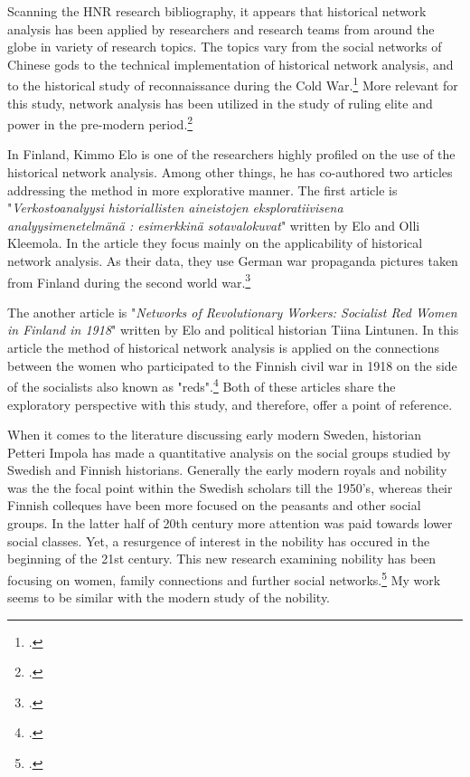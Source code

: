 \documentclass[a4paper,12pt]{article}
\begin{document}
\begin{onehalfspace}
Scanning the HNR research bibliography, it appears that historical network analysis has been applied by researchers and research teams from around the globe in variety of research topics. The topics vary from the social networks of Chinese gods to the technical implementation of historical network analysis, and to the historical study of reconnaissance during the Cold War.\footcites[p. 22.]{elo16}{hnrbib} More relevant for this study, network analysis has been utilized in the study of ruling elite and power in the pre-modern period.\footcite[See e. g. Ruth Ahnert's and Sebastian E. Ahnert's book \textit{Tudor Networks of Power} (2023) or Paul D Mclean's article \textit{Widening Access While Tightening Control: Office-Holding, Marriages, and Elite Consolidation in Early Modern Poland} (2004).]{JonVidarEt} 
 
In Finland, Kimmo Elo is one of the researchers highly profiled on the use of the historical network analysis. Among other things, he has co-authored two articles addressing the method in more explorative manner. The first article is "\textit{Verkostoanalyysi historiallisten aineistojen eksploratiivisena analyysimenetelmänä : esimerkkinä sotavalokuvat}" written by Elo and Olli Kleemola. In the article they focus mainly on the applicability of historical network analysis. As their data, they use German war propaganda pictures taken from Finland during the second world war.\footcite{eloAklee15}

The another article is "\textit{Networks of Revolutionary Workers: Socialist Red Women in Finland in 1918}" written by Elo and political historian Tiina Lintunen. In this article the method of historical network analysis is applied on the connections between the women who participated to the Finnish civil war in 1918 on the side of the socialists also known as "reds".\footcite[Almost the same article is found in Finnish in the \textit{Historiallinen Aikakauskirja} 116 (2/2018).]{LintunenAndElo2019} Both of these articles share the exploratory perspective with this study, and therefore, offer a point of reference. 

When it comes to the literature discussing early modern Sweden, historian Petteri Impola has made a quantitative analysis on the social groups studied by Swedish and Finnish historians. Generally the early modern royals and nobility was the the focal point within the Swedish scholars till the 1950's, whereas their Finnish colleques have been more focused on the peasants and other social groups. In the latter half of 20th century more attention was paid towards lower social classes. Yet, a resurgence of interest in the nobility has occured in the beginning of the 21st century. This new research examining nobility has been focusing on women, family connections and further social networks.\footcite{impola2024} My work seems to be similar with the modern study of the nobility.


\end{onehalfspace}
\end{document}

